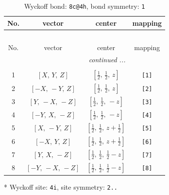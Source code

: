 \documentclass[fleqn,8pt]{jsarticle}
\begin{document}
\renewcommand{\arraystretch}{1.2}
\begin{longtable}{cccc}
\caption{Wyckoff bond: {\tt 8c@4h}, bond symmetry: {\tt 1}}
 \\
 \hline \hline
No. & vector & center & mapping \\ \hline \endfirsthead

\multicolumn{3}{l}{\tablename\ \thetable{}} \\
 \hline \hline
No. & vector & center & mapping \\ \hline \endhead

 \hline \hline
\multicolumn{3}{r}{\footnotesize\it continued ...} \\ \endfoot

 \hline \hline
\multicolumn{3}{r}{} \\ \endlastfoot

1 & $\left[ X,\, Y,\, Z \right]$ & $\left[ \frac{1}{2},\, \frac{1}{2},\, z \right]$ & {\tt [1]} \\ \hline
2 & $\left[ - X,\, - Y,\, Z \right]$ & $\left[ \frac{1}{2},\, \frac{1}{2},\, z \right]$ & {\tt [2]} \\ \hline
3 & $\left[ Y,\, - X,\, - Z \right]$ & $\left[ \frac{1}{2},\, \frac{1}{2},\, - z \right]$ & {\tt [3]} \\ \hline
4 & $\left[ - Y,\, X,\, - Z \right]$ & $\left[ \frac{1}{2},\, \frac{1}{2},\, - z \right]$ & {\tt [4]} \\ \hline
5 & $\left[ X,\, - Y,\, Z \right]$ & $\left[ \frac{1}{2},\, \frac{1}{2},\, z + \frac{1}{2} \right]$ & {\tt [5]} \\ \hline
6 & $\left[ - X,\, Y,\, Z \right]$ & $\left[ \frac{1}{2},\, \frac{1}{2},\, z + \frac{1}{2} \right]$ & {\tt [6]} \\ \hline
7 & $\left[ Y,\, X,\, - Z \right]$ & $\left[ \frac{1}{2},\, \frac{1}{2},\, \frac{1}{2} - z \right]$ & {\tt [7]} \\ \hline
8 & $\left[ - Y,\, - X,\, - Z \right]$ & $\left[ \frac{1}{2},\, \frac{1}{2},\, \frac{1}{2} - z \right]$ & {\tt [8]} \\
\end{longtable}
* Wyckoff site: {\tt 4i}, site symmetry: {\tt 2..}
\renewcommand{\arraystretch}{1.2}
\end{document}
